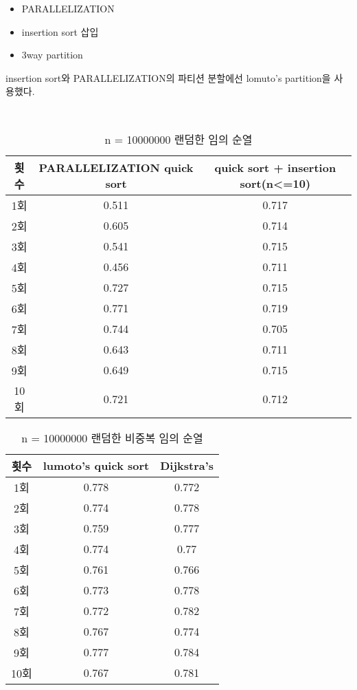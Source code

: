 \begin{itemize}
	\item PARALLELIZATION
	\item insertion sort 삽입
	\item 3way partition
\end{itemize}
insertion sort와 PARALLELIZATION의 파티션 분할에선 lomuto's partition을 사용했다.

\begin{lstlisting}[style = CStyle]
    
\end{lstlisting}


\begin{table}[h!]
	\centering
	\begin{tabular}{|c|c|c|}
		\hline\hline
		횟수 & PARALLELIZATION quick sort & quick sort + insertion sort(n<=10)\\ \hline
		1회 & 0.511 & 0.717 \\ \hline
		2회 & 0.605 & 0.714 \\ \hline
		3회 & 0.541 & 0.715 \\ \hline
		4회 & 0.456 & 0.711 \\ \hline
		5회 & 0.727 & 0.715 \\ \hline
		6회 & 0.771 & 0.719 \\ \hline
		7회 & 0.744 & 0.705 \\ \hline
		8회 & 0.643 & 0.711 \\ \hline
		9회 & 0.649 & 0.715 \\ \hline
		10회 & 0.721 & 0.712 \\ \hline
		\hline\hline
	\end{tabular}
	\caption{n = 10000000 랜덤한 임의 순열}
\end{table}


\begin{table}[h!]
	\centering
	\begin{tabular}{|c|c|c|}
		\hline\hline
		횟수 & lumoto's quick sort & Dijkstra's\\ \hline
		1회 & 0.778 & 0.772 \\ \hline
		2회 & 0.774 & 0.778 \\ \hline
		3회 & 0.759 & 0.777 \\ \hline
		4회 & 0.774 & 0.77 \\ \hline
		5회 & 0.761 & 0.766 \\ \hline
		6회 & 0.773 & 0.778 \\ \hline
		7회 & 0.772 & 0.782 \\ \hline
		8회 & 0.767 & 0.774 \\ \hline
		9회 & 0.777 & 0.784 \\ \hline
		10회 & 0.767 & 0.781 \\ \hline
		\hline\hline
	\end{tabular}
	\caption{n = 10000000 랜덤한 비중복 임의 순열}
\end{table}




